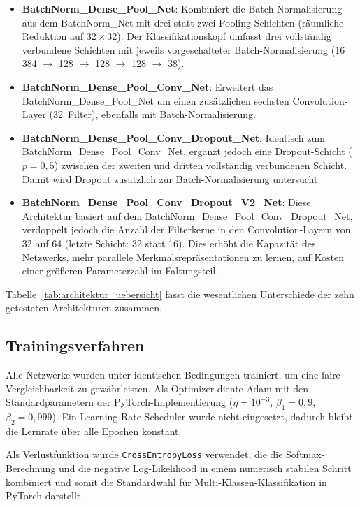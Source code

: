 \begin{itemize}
    \item \textbf{BatchNorm\_Dense\_Pool\_Net}: Kombiniert die Batch-Normalisierung aus dem BatchNorm\_Net mit drei statt zwei Pooling-Schichten (räumliche Reduktion auf $32 \times 32$). Der Klassifikationskopf umfasst drei vollständig verbundene Schichten mit jeweils vorgeschalteter Batch-Normalisierung (16\,384 $\rightarrow$ 128 $\rightarrow$ 128 $\rightarrow$ 128 $\rightarrow$ 38).
 
    \item \textbf{BatchNorm\_Dense\_Pool\_Conv\_Net}: Erweitert das BatchNorm\_Dense\_Pool\_Net um einen zusätzlichen sechsten Convolution-Layer (32~Filter), ebenfalls mit Batch-Normalisierung.
 
    \item \textbf{BatchNorm\_Dense\_Pool\_Conv\_Dropout\_Net}: Identisch zum BatchNorm\_Dense\_Pool\_Conv\_Net, ergänzt jedoch eine Dropout-Schicht ($p = 0{,}5$) zwischen der zweiten und dritten vollständig verbundenen Schicht. Damit wird Dropout zusätzlich zur Batch-Normalisierung untersucht.
 
    \item \textbf{BatchNorm\_Dense\_Pool\_Conv\_Dropout\_V2\_Net}: Diese Architektur basiert auf dem BatchNorm\_Dense\_Pool\_Conv\_Dropout\_Net, verdoppelt jedoch die Anzahl der Filterkerne in den Convolution-Layern von 32 auf 64 (letzte Schicht: 32 statt 16). Dies erhöht die Kapazität des Netzwerks, mehr parallele Merkmalsrepräsentationen zu lernen, auf Kosten einer größeren Parameterzahl im Faltungsteil.
\end{itemize}
 
Tabelle~\ref{tab:architektur_uebersicht} fasst die wesentlichen Unterschiede der zehn getesteten Architekturen zusammen.
 
\subsection{Trainingsverfahren}
\label{subsec:training}
 
Alle Netzwerke wurden unter identischen Bedingungen trainiert, um eine faire Vergleichbarkeit zu gewährleisten.
Als Optimizer diente Adam mit den Standardparametern der PyTorch-Implementierung ($\eta = 10^{-3}$, $\beta_1 = 0{,}9$, $\beta_2 = 0{,}999$).
Ein Learning-Rate-Scheduler wurde nicht eingesetzt, dadurch bleibt die Lernrate über alle Epochen konstant.

Als Verlustfunktion wurde \texttt{CrossEntropyLoss} verwendet, die die Softmax-Berechnung und die negative Log-Likelihood in einem numerisch stabilen Schritt kombiniert und somit die Standardwahl für Multi-Klassen-Klassifikation in PyTorch darstellt.

